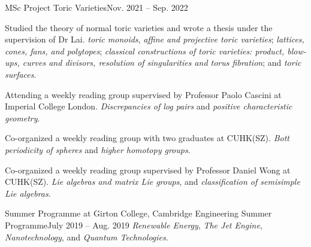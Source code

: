 \HeadingItemListStart
	\HeadingItem
		{MSc Project}{}
		{Toric Varieties}{Nov. 2021 -- Sep. 2022}
		\ItemListStart
			\item Studied the theory of normal toric varieties and wrote a thesis under the supervision of Dr Lai.
				{\textit{toric monoids}, \textit{affine and projective toric varieties};
				\textit{lattices, cones, fans, and polytopes};
				\textit{classical constructions of toric varieties: product, blow-ups, curves and divisors, resolution of singularities and torus fibration};
				 and \textit{toric surfaces}.}
		\ItemListEnd

		\ItemListStart
			\item Attending a weekly reading group supervised by Professor Paolo Cascini at Imperial College London.
				{\textit{Discrepancies of log pairs} and \textit{positive characteristic geometry}.}
		\ItemListEnd
		\ItemListStart
			\item Co-organized a weekly reading group with two graduates at CUHK(SZ).
				{\textit{Bott periodicity of spheres} and \textit{higher homotopy groups}.}
		\ItemListEnd
		\ItemListStart
			\item Co-organized a weekly reading group supervised by Professor Daniel Wong at CUHK(SZ).
				{\textit{Lie algebras and matrix Lie groups},
				and \textit{classification of semisimple Lie algebras}.}
		\ItemListEnd

	\HeadingItem
		{Summer Programme at Girton College, Cambridge}{}
		{Engineering Summer Programme}{July 2019 -- Aug. 2019}
		\ItemListStart
				{\textit{Renewable Energy}, \textit{The Jet Engine}, \textit{Nanotechnology}, and \textit{Quantum Technologies}.}
		\ItemListEnd
		
\HeadingItemListEnd

